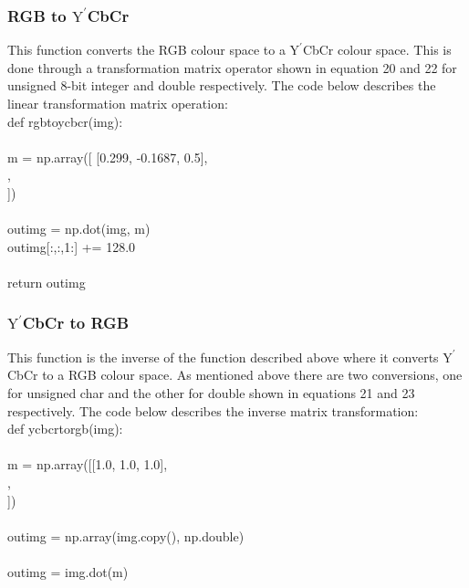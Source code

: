 \documentclass{article}
\begin{document}
	\subsubsection{RGB to $\textrm{Y}^\prime$CbCr}
	
	This function converts the RGB colour space to a $\textrm{Y}^\prime$CbCr colour space. This is done through a transformation matrix operator shown in equation 20 and 22 for unsigned 8-bit integer and double respectively. The code below describes the linear transformation matrix operation:\\
	
	\noindent def rgb\textunderscore to\textunderscore ycbcr(img):\\
	\\
	\indent m = np.array([ [0.299, -0.1687, 0.5],\\
	\indent \indent \indent \indent \indent \indent [0.587, -0.3313, -0.4187],\\
	\indent \indent \indent \indent \indent \indent[0.114, 0.5, -0.0813]])\\
	\\
	\indent out\textunderscore img = np.dot(img, m)\\
	\indent out\textunderscore img[:,:,1:] += 128.0\\
	\\
	\indent return out\textunderscore img
	
	\subsubsection{$\textrm{Y}^\prime$CbCr to RGB}
	
	This function is the inverse of the function described above where it converts $\textrm{Y}^\prime$CbCr to a RGB colour space. As mentioned above there are two conversions, one for unsigned char and the other for double shown in equations 21 and 23 respectively. The code below describes the inverse matrix transformation:\\
	
	\noindent def ycbcr\textunderscore to\textunderscore rgb(img):\\
	\\
	\indent m = np.array([[1.0, 1.0, 1.0],\\
	\indent \indent \indent \indent \indent [0, -0.34414, 1.772],\\
	\indent \indent \indent \indent \indent [1.402, -0.71414, 0]])\\
	\\
	\indent	out\textunderscore img = np.array(img.copy(), np.double)\\
	\\
	\indent	out\textunderscore img = img.dot(m)
	
\end{document}
